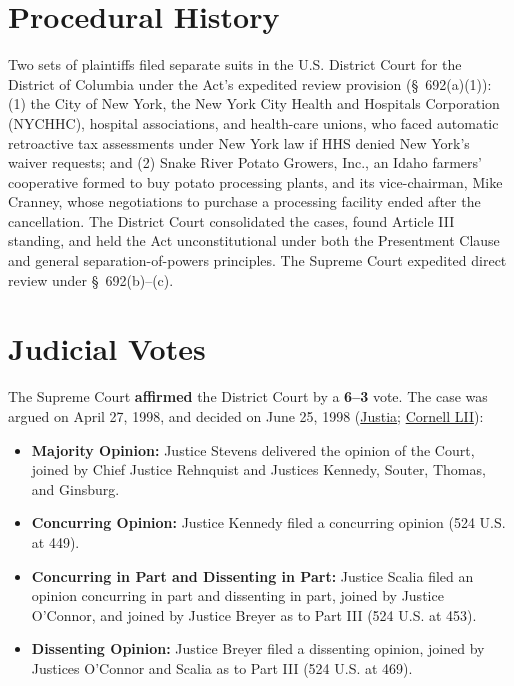 \documentclass[12pt]{article}
\begin{document}
\section{Procedural History}
Two sets of plaintiffs filed separate suits in the U.S. District Court for the District of Columbia under the Act's expedited review provision (\S~692(a)(1)): (1) the City of New York, the New York City Health and Hospitals Corporation (NYCHHC), hospital associations, and health-care unions, who faced automatic retroactive tax assessments under New York law if HHS denied New York's waiver requests; and (2) Snake River Potato Growers, Inc., an Idaho farmers' cooperative formed to buy potato processing plants, and its vice-chairman, Mike Cranney, whose negotiations to purchase a processing facility ended after the cancellation. The District Court consolidated the cases, found Article III standing, and held the Act unconstitutional under both the Presentment Clause and general separation-of-powers principles. The Supreme Court expedited direct review under \S~692(b)--(c).

\section{Judicial Votes}
The Supreme Court \textbf{affirmed} the District Court by a \textbf{6--3} vote. The case was argued on April 27, 1998, and decided on June 25, 1998 (\href{https://supreme.justia.com/cases/federal/us/524/417/}{Justia}; \href{https://www.law.cornell.edu/supct/html/97-1374.ZO.html}{Cornell LII}):

\begin{itemize}
    \item \textbf{Majority Opinion:} Justice Stevens delivered the opinion of the Court, joined by Chief Justice Rehnquist and Justices Kennedy, Souter, Thomas, and Ginsburg.
    \item \textbf{Concurring Opinion:} Justice Kennedy filed a concurring opinion (524 U.S. at 449).
    \item \textbf{Concurring in Part and Dissenting in Part:} Justice Scalia filed an opinion concurring in part and dissenting in part, joined by Justice O'Connor, and joined by Justice Breyer as to Part III (524 U.S. at 453).
    \item \textbf{Dissenting Opinion:} Justice Breyer filed a dissenting opinion, joined by Justices O'Connor and Scalia as to Part III (524 U.S. at 469).
\end{itemize}
\end{document}
